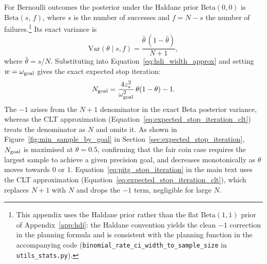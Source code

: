 For Bernoulli outcomes the posterior under the Haldane prior $\mathrm{Beta}(0,0)$
is $\mathrm{Beta}(s,\,f)$, where $s$ is the number of successes and
$f = N - s$ the number of failures.\footnote{This appendix uses the
Haldane prior rather than the flat $\mathrm{Beta}(1,1)$ prior of
Appendix~\ref{app:hdi}: the Haldane convention yields the clean $-1$ correction
in the planning formula and is consistent with the planning function in the
accompanying code (\texttt{binomial\_rate\_ci\_width\_to\_sample\_size} in
\texttt{utils\_stats.py}).}
Its exact variance is
\[
\mathrm{Var}(\theta \mid s, f) = \frac{\hat\theta\,(1-\hat\theta)}{N+1},
\]
where $\hat\theta = s/N$. Substituting into Equation~\ref{eq:hdi_width_approx}
and setting $w = \omega_{\rm goal}$ gives the exact expected stop iteration:
\begin{equation}\label{eq:expected_stop_iteration_binomial}
N_{\rm goal} = \frac{4 z_{*}^{2}}{\omega_{\rm goal}^{2}}\,\theta(1-\theta) - 1.
\end{equation}
The $-1$ arises from the $N+1$ denominator in the exact Beta posterior variance,
whereas the CLT approximation (Equation~\ref{eq:expected_stop_iteration_clt})
treats the denominator as $N$ and omits it.
As shown in Figure~\ref{fig:min_sample_by_goal} in Section~\ref{sec:expected_stop_iteration},
$N_{\rm goal}$ is maximised at $\theta=0.5$, confirming that the fair coin case requires the
largest sample to achieve a given precision goal, and decreases monotonically as
$\theta$ moves towards $0$ or $1$.
Equation~\ref{eq:pitg_stop_iteration} in the main text uses the CLT approximation
(Equation~\ref{eq:expected_stop_iteration_clt}), which replaces $N+1$ with $N$ and
drops the $-1$ term, negligible for large $N$.
%
%
%

